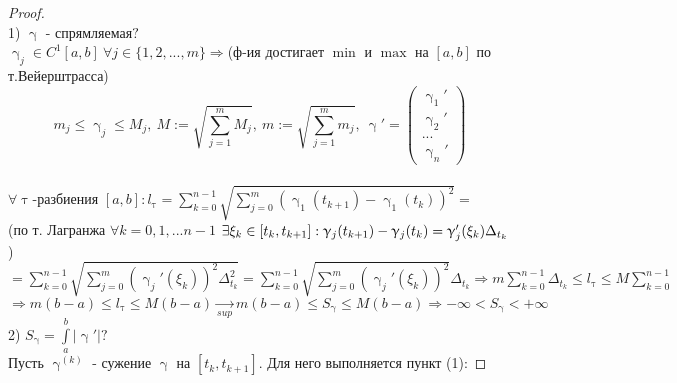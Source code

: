 \documentclass[12pt, fleqn]{article}
\begin{document}
\begin{Property}[3]
\begin{Property}[4]
\begin{Property}[2, аддитивность]
\begin{Proof}
\begin{proof}
    \\
    1) $\upgamma$ - спрямляемая$?$
    \\
    $\upgamma_j \in C^1[a,b]\ \forall j \in \{1,2,...,m\} \Rightarrow$(ф-ия достигает $\min$ и $\max$ на $[a,b]$ по т.Вейерштрасса) 
    $$m_j \leqslant \upgamma_j \leqslant M_j,\ M := \sqrt{\sum\limits_{j=1}^m M_j},\ m := \sqrt{\sum\limits_{j=1}^m m_j},\ \upgamma' = \begin{pmatrix}
      \upgamma_1'\\
      \upgamma_2'\\
      ...\\
      \upgamma_n'
    \end{pmatrix}$$
    \\
    $\forall \uptau$-разбиения $[a,b]: l_\uptau = \sum\limits_{k=0}^{n-1} \sqrt{\sum\limits_{j=0}^m (\upgamma_1(t_{k+1}) - \upgamma_1(t_k))^2} = $
    \\
    (по т. Лагранжа $\forall k = 0,1,...n-1$ $\exists \xi_k \in [t_k, t_{k+1}]: \upgamma_j(t_{k+1}) - \upgamma_j(t_k) = \upgamma_j'(\xi_k) \Delta_{t_k}$)
    \\
    $= \sum\limits_{k=0}^{n-1} \sqrt{\sum\limits_{j=0}^m (\upgamma_j'(\xi_k))^2 \Delta_{t_k}^2} = \sum\limits_{k=0}^{n-1} \sqrt{\sum\limits_{j=0}^m (\upgamma_j'(\xi_k))^2} \Delta_{t_k} \Rightarrow m \sum\limits_{k=0}^{n-1} \Delta_{t_k} \leqslant l_\uptau \leqslant M \sum\limits_{k=0}^{n-1}$
    \\
    $\Rightarrow m (b-a) \leqslant l_\uptau \leqslant M (b-a) \underset{sup}{\rightarrow} m (b-a) \leqslant S_\upgamma \leqslant M (b-a) \Rightarrow -\infty < S_\upgamma < +\infty$ 
    \\
    2) $S_{\upgamma} = \int\limits_a^b |\upgamma'|?$
    \\
    Пусть $\upgamma^{(k)}$ - сужение $\upgamma$ на $[t_k,t_{k+1}]$. Для него выполняется пункт (1):
    

\end{proof}
\end{Proof}
\end{Property}
\end{Property}
\end{Property}
\end{document}
